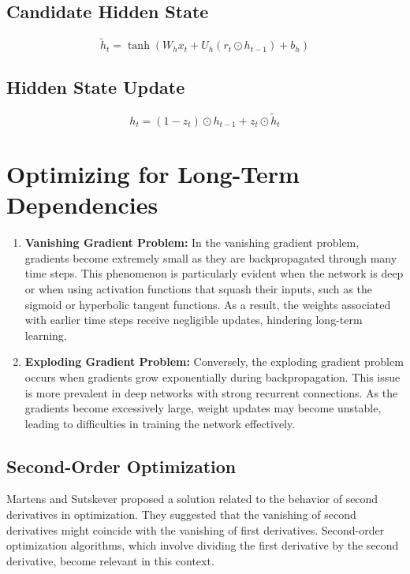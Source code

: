 \documentclass{report}
\begin{document}
\subsection{Candidate Hidden State}
   \[
   \tilde{h}_t = \tanh(W_{h} x_t + U_{h} (r_t \odot h_{t-1}) + b_{h})
   \]

\subsection{Hidden State Update}
   \[
   h_t = (1 - z_t) \odot h_{t-1} + z_t \odot \tilde{h}_t
   \]

\section{Optimizing for Long-Term Dependencies}

\begin{enumerate}[label=\arabic*.]
  \item \textbf{Vanishing Gradient Problem:}
In the vanishing gradient problem, gradients become extremely small as they are backpropagated through many time steps. This phenomenon is particularly evident when the network is deep or when using activation functions that squash their inputs, such as the sigmoid or hyperbolic tangent functions. As a result, the weights associated with earlier time steps receive negligible updates, hindering long-term learning.

  \item \textbf{Exploding Gradient Problem:}
Conversely, the exploding gradient problem occurs when gradients grow exponentially during backpropagation. This issue is more prevalent in deep networks with strong recurrent connections. As the gradients become excessively large, weight updates may become unstable, leading to difficulties in training the network effectively.
\end{enumerate}

\subsection{Second-Order Optimization}

Martens and Sutskever proposed a solution related to the behavior of second derivatives in optimization. They suggested that the vanishing of second derivatives might coincide with the vanishing of first derivatives. Second-order optimization algorithms, which involve dividing the first derivative by the second derivative, become relevant in this context.
\end{document}
